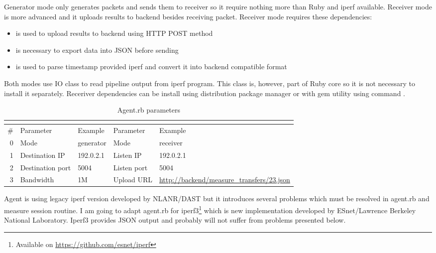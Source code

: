 Generator mode only generates packets and sends them to receiver so it require nothing more than Ruby and iperf available. Receiver mode is more advanced and it uploads results to backend besides receiving packet. Receiver mode requires these dependencies:
\begin{itemize}
	\item {} is used to upload results to backend using \Ac{HTTP} POST method
	\item {} is necessary to export data into \Ac{JSON} before sending
	\item {} is used to parse timestamp provided iperf and convert it into backend compatible format
\end{itemize}

Both modes use IO class to read pipeline output from iperf program. This class is, however, part of Ruby core so it is not necessary to install it separately. Receriver dependencies can be install using distribution package manager or with gem utility using command .

\begin{table}[htb]
\begin{center}
	\caption{Agent.rb parameters}
	\label{tab:agent-parameters}
	\begin{tabularx}{\textwidth}{|r|l|l||l|X|}
	\multicolumn{3}{c}{\Th{Generator mode}} & \multicolumn{2}{c}{\Th{Receiver mode}} \\
	\hline
	\# & {Parameter} & {Example}  & {Parameter} & {Example} \\
	\hline
	\hline
	0 & Mode & generator & Mode & receiver \\
	\hline
	1 & Destination \Ac{IP} & 192.0.2.1 & Listen \Ac{IP} & 192.0.2.1 \\
	\hline
	2 & Destination port & 5004 & Listen port & 5004 \\
	\hline
	3 & Bandwidth & 1M & Upload \Ac{URL} & \url{http://backend/measure_transfers/23.json} \\
	\hline
	\end{tabularx}
\end{center}
\end{table}


Agent is using legacy iperf version developed by NLANR/DAST but it introduces several problems which must be resolved in agent.rb and measure session routine. I am going to adapt agent.rb for iperf3\footnote{Available on \url{https://github.com/esnet/iperf}} which is new implementation developed by ESnet/Lawrence Berkeley National Laboratory. Iperf3 provides \Ac{JSON} output and probably will not suffer from problems presented below.

